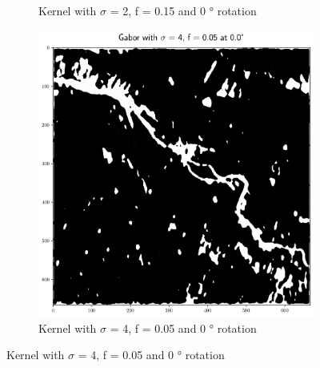 \documentclass[a4paper, english]{article}
\begin{document}
\begin{figure}[!htbp]
\begin{subfigure}[b]{0.3\textwidth}
         \caption{Kernel with $\sigma$ = 2, f = 0.15 and 0 ° rotation}\label{fig:feat02}
     \end{subfigure}
     \hfill
     \begin{subfigure}[b]{0.3\textwidth}
         \centering
         \includegraphics[width=\textwidth]{img/Features_4_005_0.png}
         \caption{Kernel with $\sigma$ = 4, f = 0.05 and 0 ° rotation}\label{fig:feat03}
     \end{subfigure}


\end{figure}
\end{document}
